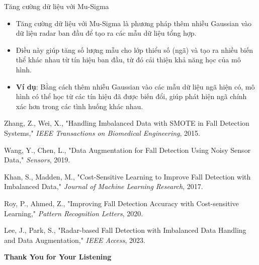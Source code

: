 \documentclass{beamer}
\begin{document}
\begin{frame}{Tăng cường dữ liệu với Mu-Sigma}
    \begin{itemize}
    \item Tăng cường dữ liệu với Mu-Sigma là phương pháp thêm nhiễu Gaussian vào dữ liệu radar ban đầu để tạo ra các mẫu dữ liệu tổng hợp.
    \item Điều này giúp tăng số lượng mẫu cho lớp thiểu số (ngã) và tạo ra nhiều biến thể khác nhau từ tín hiệu ban đầu, từ đó cải thiện khả năng học của mô hình.
    \item \textbf{Ví dụ}: Bằng cách thêm nhiễu Gaussian vào các mẫu dữ liệu ngã hiện có, mô hình có thể học từ các tín hiệu đã được biến đổi, giúp phát hiện ngã chính xác hơn trong các tình huống khác nhau.
    \end{itemize}
\end{frame}


\begin{thebibliography}{99}

Zhang, Z., Wei, X., "Handling Imbalanced Data with SMOTE in Fall Detection Systems," \emph{IEEE Transactions on Biomedical Engineering}, 2015.

Wang, Y., Chen, L., "Data Augmentation for Fall Detection Using Noisy Sensor Data," \emph{Sensors}, 2019.

Khan, S., Madden, M., "Cost-Sensitive Learning to Improve Fall Detection with Imbalanced Data," \emph{Journal of Machine Learning Research}, 2017.

Roy, P., Ahmed, Z., "Improving Fall Detection Accuracy with Cost-sensitive Learning," \emph{Pattern Recognition Letters}, 2020.

Lee, J., Park, S., "Radar-based Fall Detection with Imbalanced Data Handling and Data Augmentation," \emph{IEEE Access}, 2023.

\end{thebibliography}


\begin{frame}{}
  \centering \Huge
  \textbf{Thank You for Your Listening}
\end{frame}
\end{document}
